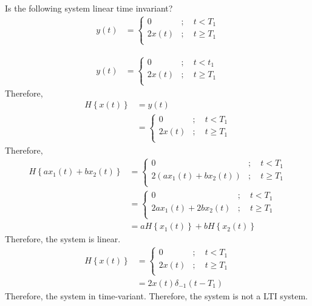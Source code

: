 \documentclass[fleqn, a4paper, 11pt, oneside]{amsart}
\theoremstyle{definition}
\theoremstyle{theorem}
\begin{document}
\begin{question}
	Is the following system linear time invariant?
	\begin{align*}
		y(t) &=
			\begin{cases}
				0      & ;\quad t < T_1   \\
				2 x(t) & ;\quad t \ge T_1 \\
			\end{cases}
	\end{align*}
\end{question}

\begin{solution}
	\begin{align*}
		y(t) &=
			\begin{cases}
				0      & ;\quad t < t_1   \\
				2 x(t) & ;\quad t \ge T_1 \\
			\end{cases}
	\end{align*}
	Therefore,
	\begin{align*}
		H\left\{ x(t) \right\} &= y(t)\\
		&=
			\begin{cases}
				0      & ;\quad t < T_1   \\
				2 x(t) & ;\quad t \ge T_1 \\
			\end{cases}
	\end{align*}
	Therefore,
	\begin{align*}
		H\left\{ a x_1(t) + b x_2(t) \right\} &=
			\begin{cases}
				0                                    & ;\quad t < T_1   \\
				2 \left( a x_1(t) + b x_2(t) \right) & ;\quad t \ge T_1 \\
			\end{cases}\\
		&=
			\begin{cases}
				0                       & ;\quad t < T_1   \\
				2 a x_1(t) + 2 b x_2(t) & ;\quad t \ge T_1 \\
			\end{cases}\\
		&= a H\left\{ x_1(t) \right\} + b H\left\{ x_2(t) \right\}
	\end{align*}
	Therefore, the system is linear.
	\begin{align*}
		H\left\{ x(t) \right\} &=
			\begin{cases}
				0      & ;\quad t < T_1   \\
				2 x(t) & ;\quad t \ge T_1 \\
			\end{cases}\\
		&= 2 x(t) \delta_{-1}(t - T_1)
	\end{align*}
	Therefore, the system in time-variant.
	Therefore, the system is not a LTI system.
\end{solution}
\end{document}
